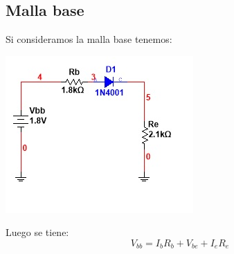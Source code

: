 \documentclass[10pt,a4paper]{article}
\begin{document}
\subsection{Malla base}
Si consideramos la malla base tenemos:
\begin{center}
\includegraphics[scale=1]{Images/Imagen6.jpg}
\end{center}
Luego se tiene:
\begin{equation}
V_{bb}=I_{b}R_{b}+V_{be}+I_{e}R_{e}
\end{equation}
\end{document}
